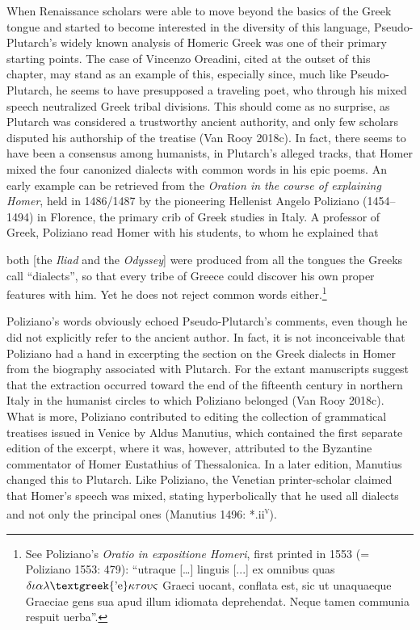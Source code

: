 \documentclass[12pt]{article}
\newenvironment{styleStandard}{\renewcommand\baselinestretch{1.25}\setlength\leftskip{0in}\setlength\rightskip{0in}\setlength\parindent{0.1972in}\setlength\parfillskip{0pt plus 1fil}\setlength\parskip{0in plus 1pt}\writerlistparindent\writerlistleftskip\leavevmode\normalfont\normalsize\writerlistlabel\ignorespaces}{\unskip\vspace{0in plus 1pt}\par}
\newenvironment{styleQuote}{\renewcommand\baselinestretch{1.25}\setlength\leftskip{0.3937in}\setlength\rightskip{0in}\setlength\parindent{0in}\setlength\parfillskip{0pt plus 1fil}\setlength\parskip{0.1665in plus 0.016649999in}\writerlistparindent\writerlistleftskip\leavevmode\normalfont\normalsize\writerlistlabel\ignorespaces}{\unskip\vspace{0.1665in plus 0.016649999in}\par}
\newcommand\writerlistleftskip{}
\newcommand\writerlistparindent{}
\newcommand\writerlistlabel{}
\begin{document}
\begin{styleStandard}
When Renaissance scholars were able to move beyond the basics of the Greek tongue and started to become interested in the diversity of this language, Pseudo-Plutarch’s widely known analysis of Homeric Greek was one of their primary starting points. The case of Vincenzo Oreadini, cited at the outset of this chapter, may stand as an example of this, especially since, much like Pseudo-Plutarch, he seems to have presupposed a traveling poet, who through his mixed speech neutralized Greek tribal divisions. This should come as no surprise, as Plutarch was considered a trustworthy ancient authority, and only few scholars disputed his authorship of the treatise (Van Rooy 2018c). In fact, there seems to have been a consensus among humanists, in Plutarch’s alleged tracks, that Homer mixed the four canonized dialects with common words in his epic poems. An early example can be retrieved from the \textit{Oration in the course of explaining Homer}, held in 1486/1487 by the pioneering Hellenist Angelo Poliziano (1454–1494) in Florence, the primary crib of Greek studies in Italy. A professor of Greek, Poliziano read Homer with his students, to whom he explained that
\end{styleStandard}

\begin{styleQuote}
both [the \textit{Iliad} and the \textit{Odyssey}] were produced from all the tongues the Greeks call “dialects”, so that every tribe of Greece could discover his own proper features with him. Yet he does not reject common words either.\footnote{ See Poliziano’s \textit{Oratio in expositione Homeri}, first printed in 1553 (= Poliziano 1553: 479): “utraque […] linguis [...] ex omnibus quas $\delta \iota \alpha \lambda \text{\textgreek{'e}}\kappa \tau o\upsilon \varsigma $ Graeci uocant, conflata est, sic ut unaquaeque Graeciae gens sua apud illum idiomata deprehendat. Neque tamen communia respuit uerba”.}
\end{styleQuote}

\begin{styleStandard}
Poliziano’s words obviously echoed Pseudo-Plutarch’s comments, even though he did not explicitly refer to the ancient author. In fact, it is not inconceivable that Poliziano had a hand in excerpting the section on the Greek dialects in Homer from the biography associated with Plutarch. For the extant manuscripts suggest that the extraction occurred toward the end of the fifteenth century in northern Italy in the humanist circles to which Poliziano belonged (Van Rooy 2018c). What is more, Poliziano contributed to editing the collection of grammatical treatises issued in Venice by Aldus Manutius, which contained the first separate edition of the excerpt, where it was, however, attributed to the Byzantine commentator of Homer Eustathius of Thessalonica. In a later edition, Manutius changed this to Plutarch. Like Poliziano, the Venetian printer-scholar claimed that Homer’s speech was mixed, stating hyperbolically that he used all dialects and not only the principal ones (Manutius 1496: *.ii\textsc{\textsuperscript{v}}).
\end{styleStandard}
\end{document}
